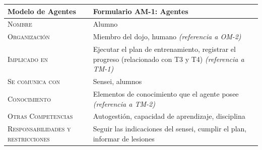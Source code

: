 \documentclass[12pt,a4paper,twoside,spanish]{article}      %
\begin{document}
        \begin{table}[H]
            \scriptsize
            \begin{tabularx}{\textwidth}{|l|X|} \hline
                \textbf{Modelo de Agentes} & \textbf{Formulario AM-1: Agentes} \\ \hline\hline
                
                \textsc{Nombre} &  Alumno \\ \hline
                
                \textsc{Organización} &  Miembro del dojo, humano \emph{(referencia a OM-2)}\\ \hline
                
                \textsc{Implicado en} & Ejecutar el plan de entrenamiento, registrar el progreso (relacionado con T3 y T4) \emph{(referencia a TM-1)} \\ \hline
                
                \textsc{Se comunica con} &  Sensei, alumnos  \\ \hline
                
                \textsc{Conocimiento} &  Elementos de conocimiento que el agente posee \emph{(referencia a TM-2)} \\ \hline
                
                \textsc{Otras Competencias} &  Autogestión, capacidad de aprendizaje, disciplina \\ \hline
                
                \textsc{Responsabilidades y restricciones} &  Seguir las indicaciones del sensei, cumplir el plan, informar de lesiones\\ \hline
            \end{tabularx}
             \label{tab.AM1}
        \end{table}
        
        
        \pagebreak


\end{document}

